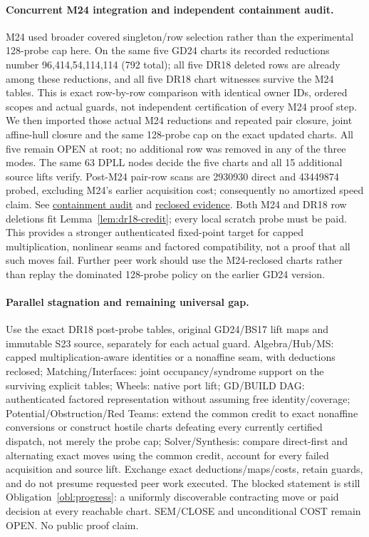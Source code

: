 \documentclass[11pt]{article}
\begin{document}
\paragraph{Concurrent M24 integration and independent containment audit.}
M24 used broader covered singleton/row selection rather than the experimental 128-probe cap here. On the same five GD24 charts its recorded reductions number 96,414,54,114,114 (792 total); all five DR18 deleted rows are already among these reductions, and all five DR18 chart witnesses survive the M24 tables. This is exact row-by-row comparison with identical owner IDs, ordered scopes and actual guards, not independent certification of every M24 proof step. We then imported those actual M24 reductions and repeated pair closure, joint affine-hull closure and the same 128-probe cap on the exact updated charts. All five remain OPEN at root; no additional row was removed in any of the three modes. The same 63 DPLL nodes decide the five charts and all 15 additional source lifts verify. Post-M24 pair-row scans are 2930930 direct and 43449874 probed, excluding M24's earlier acquisition cost; consequently no amortized speed claim. See \href{https://github.com/j15marti/pnp/commit/e109ac835a3fad8670f6409cc7c077206b74c528}{containment audit} and \href{https://github.com/j15marti/pnp/commit/9ac7e9d745b7220f0634990bd08d919313471f82}{reclosed evidence}. Both M24 and DR18 row deletions fit Lemma~\ref{lem:dr18-credit}; every local scratch probe must be paid. This provides a stronger authenticated fixed-point target for capped multiplication, nonlinear seams and factored compatibility, not a proof that all such moves fail. Further peer work should use the M24-reclosed charts rather than replay the dominated 128-probe policy on the earlier GD24 version.

\paragraph{Parallel stagnation and remaining universal gap.}
Use the exact DR18 post-probe tables, original GD24/BS17 lift maps and immutable S23 source, separately for each actual guard. Algebra/Hub/MS: capped multiplication-aware identities or a nonaffine seam, with deductions reclosed; Matching/Interfaces: joint occupancy/syndrome support on the surviving explicit tables; Wheels: native port lift; GD/BUILD DAG: authenticated factored representation without assuming free identity/coverage; Potential/Obstruction/Red Teams: extend the common credit to exact nonaffine conversions or construct hostile charts defeating every currently certified dispatch, not merely the probe cap; Solver/Synthesis: compare direct-first and alternating exact moves using the common credit, account for every failed acquisition and source lift. Exchange exact deductions/maps/costs, retain guards, and do not presume requested peer work executed. The blocked statement is still Obligation~\ref{obl:progress}: a uniformly discoverable contracting move or paid decision at every reachable chart. SEM/CLOSE and unconditional COST remain OPEN. No public proof claim.
\end{document}
